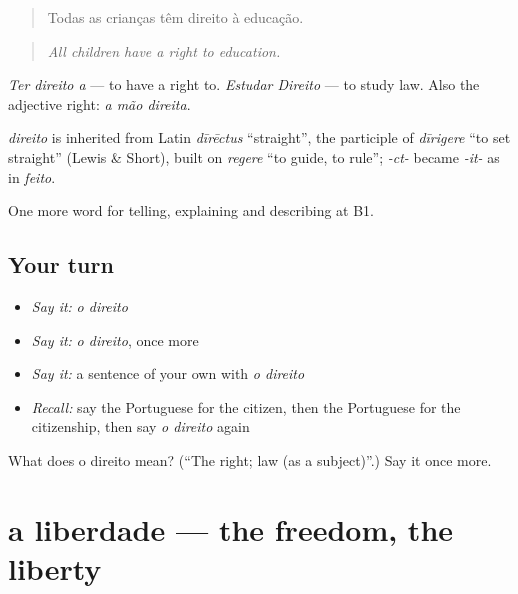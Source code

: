 \begin{quote}
Todas as crianças têm direito à educação.
\end{quote}

\begin{quote}
\emph{All children have a right to education.}
\end{quote}

\emph{Ter direito a} — to have a right to. \emph{Estudar Direito} — to study law. Also the adjective right: \emph{a mão direita}.

\begin{cousinweb}
\emph{direito} is inherited from Latin \emph{dīrēctus} \textquotedblleft{}straight\textquotedblright{}, the participle of \emph{dīrigere} \textquotedblleft{}to set straight\textquotedblright{} (Lewis \& Short), built on \emph{regere} \textquotedblleft{}to guide, to rule\textquotedblright{}; \emph{-ct-} became \emph{-it-} as in \emph{feito}.
\end{cousinweb}

\begin{grammarlens}[title={What you've built}]
One more word for telling, explaining and describing at B1.
\end{grammarlens}

\subsection*{Your turn}
\begin{itemize}
\raggedright
  \item \emph{Say it:} \emph{o direito}
  \item \emph{Say it:} \emph{o direito}, once more
  \item \emph{Say it:} a sentence of your own with \emph{o direito}
  \item \emph{Recall:} say the Portuguese for the citizen, then the Portuguese for the citizenship, then say \emph{o direito} again
\end{itemize}

\begin{tcolorbox}[breakable,colback=teal!4,colframe=teal!35!black,title={Before you move on}]
What does o direito mean? (\textquotedblleft{}The right; law (as a subject)\textquotedblright{}.) Say it once more.
\end{tcolorbox}
\section[a liberdade]{a liberdade — the freedom, the liberty}

